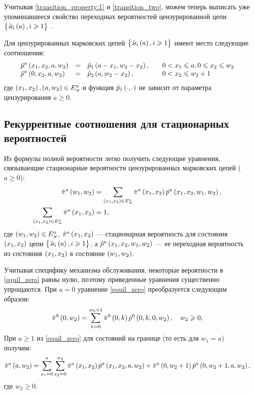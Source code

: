 \documentclass[a4paper,14pt,russian]{article}
\newcommand{\Markkhata}[0]{\brrr{ \hat{\vk}_i\br{a}, i \geqslant 1}}
\newcommand{\p}{\hat{p}}
\begin{document}
Учитывая \eqref{transition_property:1} и \eqref{transition_two}, можем теперь выписать уже упоминавшееся свойство
переходных вероятностей цензурированной цепи $\Markkhata$ .
\begin{lemma}
 Для цензурированных марковских цепей $\Markkhata$ имеют место следующие соотношения:
 \begin{equation}
\begin{array}{llll}
\displaystyle \p^a \br{x_1, x_2, a, w_2} &=& \p_1 \br{a - x_1, w_2 - x_2},& \quad 
 0 < x_1 \leqslant a, 0 \leqslant x_2 \leqslant w_2\\
\displaystyle \p^a \br{0, x_2, a, w_2} &=& \p_2 \br{a, w_2 - x_2},& \quad  0 < x_2 \leqslant w_2 + 1
\end{array}
\label{transition_property:2}
\end{equation}
где $\left(x_1,x_2\right), \left(a,w_2\right) \in E_{\varkappa}^a$ и функция $\p_1 \br{\cdot, \cdot}$ не зависит от параметра цензурирования $a \geqslant 0$.
\end{lemma}

\subsection{Рекуррентные соотношения для стационарных вероятностей}
Из формулы полной вероятности легко получить следующие уравнения, связывающие стационарные вероятности цензурированных марковских цепей ($a \geqslant 0$):
\begin{align}
\hat{\pi}^a \left(w_1, w_2\right) & =\sum_{\left(x_1,x_2\right)\in E^a_{\varkappa}} \hat{\pi}^a\left(x_1,x_2\right) \hat{p}^a\left(x_1,x_2,w_1,w_2\right),\label{equil_zero}\\
\sum_{\left(x_1,x_2\right)\in E^a_{\varkappa}} \hat{\pi}^a\left(x_1,x_2\right) & =1,
\end{align}
где $\left(w_1,w_2\right) \in E^a_{\varkappa}$, $\hat{\pi}^a\left(x_1,x_2\right)$ --- стационарная вероятность для состояния $\left(x_1,x_2\right)$ цепи 
$\Markkhata$, а $\hat{p}^a\left(x_1,x_2,w_1,w_2\right)$ --- ее переходная вероятность из состояния $\left(x_1,x_2\right)$ в состояние $\left(w_1,w_2\right)$.

Учитывая специфику механизма обслуживания, некоторые вероятности в \eqref{equil_zero} равны нулю, 
поэтому приведенные уравнения существенно упрощаются. При $a=0$
 уравнение \eqref{equil_zero} преобразуется следующим образом:
\begin{equation}
\hat{\pi}^0 \left(0,w_2\right) = \sum_{k = 0}^{w_2 +1} \hat{\pi}^0\left(0,k\right) \hat{p}^0\left(0,k,0,w_2\right), \quad w_2 \geqslant 0,
\label{equil_zero:1}
\end{equation}
При $a\geqslant 1$ из \eqref{equil_zero} для состояний на границе (то есть для $w_1 = a$) получим: 
\begin{equation}
\hat{\pi}^a \br{a, w_2} = \sum_{x_1 = 0}^{a}\sum_{x_2 = 0}^{w_2} \hat{\pi}^a\br{x_1,x_2} \p^a\br{x_1,x_2,a,w_2} +
 \hat{\pi}^a\br{0,w_2 + 1} \p^a\br{0,w_2 + 1,a,w_2},
\label{equil_zero:2}
\end{equation}
где $w_2 \geqslant 0$.
\end{document}
